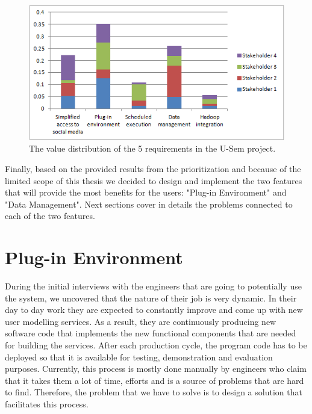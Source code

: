 \begin{figure}[h!]
  \centering
      \includegraphics{requirements/value_diagram.png}
  \caption{The value distribution of the 5 requirements in the U-Sem project.}
  \label{fig:reqPriority}
\end{figure}


Finally, based on the provided results from the prioritization and because of the limited scope of this thesis we decided to design and implement the two features that will provide the most benefits for the users: "Plug-in Environment" and "Data Management". Next sections cover in details the problems connected to each of the two features.

\section{Plug-in Environment}
\label{sec:problemDefPlugin}

During the initial interviews with the engineers that are going to potentially use the system, we uncovered that the nature of their job is very dynamic. In their day to day work they are expected to constantly improve and come up with new user modelling services. As a result, they are continuously producing new software code that implements the new functional components that are needed for building the services. After each production cycle, the program code has to be deployed so that it is available for testing, demonstration and evaluation purposes. Currently, this process is mostly done manually by engineers who claim that it takes them a lot of time, efforts and is a source of problems that are hard to find. Therefore, the problem that we have to solve is to design a solution that facilitates this process. 

